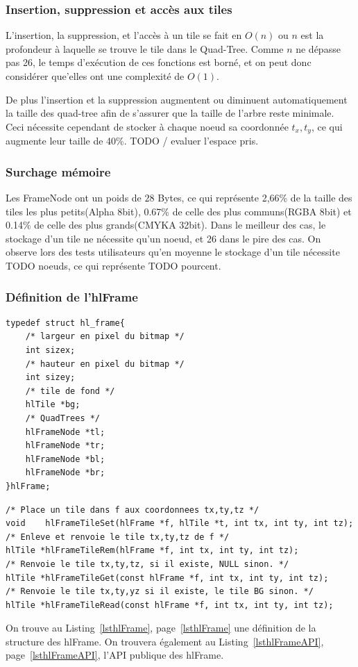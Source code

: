 			\subsubsection{Insertion, suppression et accès aux tiles}
				L'insertion, la suppression, et l'accès à un tile se fait en $O(n)$ ou $n$ est la profondeur à laquelle se trouve le tile dans 
				le Quad-Tree. Comme $n$ ne dépasse pas 26, le temps d'exécution de ces fonctions est borné, et on peut donc considérer que'elles
				ont une complexité de $O(1)$. 
				
				De plus l'insertion et la suppression augmentent ou diminuent automatiquement la taille des 
				quad-tree afin de s'assurer que la taille de l'arbre reste minimale. Ceci nécessite cependant de stocker à chaque noeud 
				sa coordonnée $t_x,t_y$, ce qui augmente leur taille de 40\%. TODO / evaluer l'espace pris.

			\subsubsection{Surchage mémoire}
				Les FrameNode ont un poids de $28$ Bytes, ce qui représente 2,66\% de la taille des tiles les plus petits(Alpha 8bit), 0.67\% de celle des plus
				communs(RGBA 8bit)  et 0.14\% de celle des plus grands(CMYKA 32bit). Dans le meilleur des cas, le stockage d'un tile ne 
				nécessite qu'un noeud, et 26 dans le pire des cas. On observe lors des tests utilisateurs qu'en moyenne le stockage d'un tile
				nécessite TODO noeuds, ce qui représente TODO pourcent.
			\subsubsection{Définition de l'hlFrame}
		\begin{lstlisting}[float,caption={Définition des hlFrames },frame=tb,label=lsthlFrame]
typedef struct hl_frame{
	/* largeur en pixel du bitmap */
	int sizex;
	/* hauteur en pixel du bitmap */
	int sizey;
	/* tile de fond */
	hlTile *bg;
	/* QuadTrees */
	hlFrameNode *tl;
	hlFrameNode *tr;
	hlFrameNode *bl;
	hlFrameNode *br;
}hlFrame;
		\end{lstlisting}
		\begin{lstlisting}[float,caption={API Publique des hlFrame},frame=tb,label=lsthlFrameAPI]
/* Place un tile dans f aux coordonnees tx,ty,tz */
void	hlFrameTileSet(hlFrame *f, hlTile *t, int tx, int ty, int tz); 
/* Enleve et renvoie le tile tx,ty,tz de f */
hlTile *hlFrameTileRem(hlFrame *f, int tx, int ty, int tz); 
/* Renvoie le tile tx,ty,tz, si il existe, NULL sinon. */
hlTile *hlFrameTileGet(const hlFrame *f, int tx, int ty, int tz);
/* Renvoie le tile tx,ty,yz si il existe, le tile BG sinon. */
hlTile *hlFrameTileRead(const hlFrame *f, int tx, int ty, int tz);
		\end{lstlisting}
				On trouve au Listing~\ref{lsthlFrame}, page~\ref{lsthlFrame} une définition de la structure des hlFrame.
				On trouvera également au Listing~\ref{lsthlFrameAPI}, page~\ref{lsthlFrameAPI}, 
				l'API publique des hlFrame.


